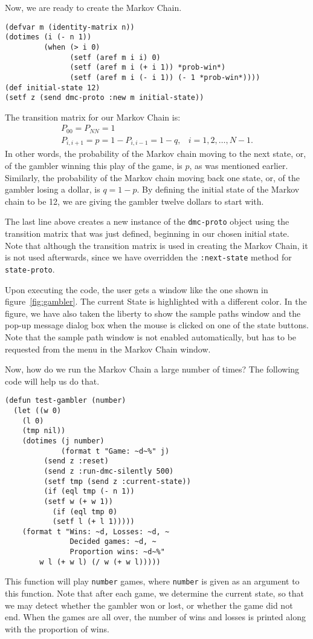Now, we are ready to create the Markov Chain. 
\begin{verbatim}
(defvar m (identity-matrix n))
(dotimes (i (- n 1))
         (when (> i 0)
               (setf (aref m i i) 0)
               (setf (aref m i (+ i 1)) *prob-win*)
               (setf (aref m i (- i 1)) (- 1 *prob-win*))))
(def initial-state 12)
(setf z (send dmc-proto :new m initial-state))
\end{verbatim}
The transition matrix for our Markov Chain is:
\[ \begin{array}{ll}
	P_{00}=P_{NN}=1 & \\
   	P_{i,i+1}=p=1-P_{i,i-1}=1-q, & i=1,2,\ldots,N-1.
   \end{array} \]
In other words, the probability of the Markov chain moving to the next
state, or, of the gambler winning this play of the game, is $p$, as
was mentioned earlier.  Similarly, the probability of the Markov chain
moving back one state, or, of the gambler losing a dollar, is $q=1-p$.
By defining the initial state of the Markov chain to be 12, we are giving
the gambler twelve dollars to start with.

The last line above creates a new instance of the {\tt dmc-proto}
object using the transition matrix that was just defined, beginning in
our chosen initial state.  Note that although the transition matrix is
used in creating the Markov Chain, it is not used afterwards, since we
have overridden the {\tt :next-state} method for {\tt state-proto}. 

Upon executing the code, the user gets a window like the one shown in
figure~\ref{fig:gambler}.  The current State is highlighted with a
different color. In the figure, we have also
taken the liberty to show the sample paths window and the pop-up
message dialog box when the mouse is clicked on one of the state
buttons.  Note that the sample path window is not enabled
automatically, but has to be requested from the menu in the
Markov Chain window.

Now, how do we run the Markov Chain a large number of times?  The
following code will help us do that.
\begin{verbatim}
(defun test-gambler (number)
  (let ((w 0)
	(l 0)
	(tmp nil))
    (dotimes (j number)
             (format t "Game: ~d~%" j)
	     (send z :reset)
	     (send z :run-dmc-silently 500)
	     (setf tmp (send z :current-state))
	     (if (eql tmp (- n 1))
		 (setf w (+ w 1))
	       (if (eql tmp 0)
		   (setf l (+ l 1)))))
    (format t "Wins: ~d, Losses: ~d, ~
               Decided games: ~d, ~
               Proportion wins: ~d~%"
	    w l (+ w l) (/ w (+ w l)))))
\end{verbatim}
This function will play {\tt number} games, where {\tt number} is
given as an argument to this function.  Note that after each game, we
determine the current state, so that we may detect whether the gambler
won or lost, or whether the game did not end.  When the games are all
over, the number of wins and losses is printed along with the
proportion of wins. 

